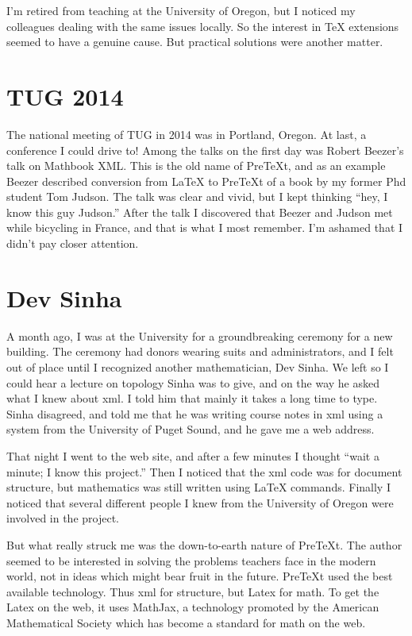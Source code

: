 \documentclass[11pt, oneside]{article}   	%
\begin{document}
I'm retired from teaching at the University of Oregon, but I noticed my colleagues dealing with the same issues locally. So the interest in TeX extensions seemed to have a genuine cause. But practical solutions were another matter.

\section{TUG 2014}

The national meeting of TUG in 2014 was in Portland, Oregon. At last, a conference I could drive to! Among the talks on the first day was Robert Beezer's talk on Mathbook XML. This is the old name of PreTeXt, and as an example Beezer described conversion from LaTeX to PreTeXt of a book by my former Phd student Tom Judson.
The talk was clear and vivid, but I kept thinking ``hey, I know this guy Judson.''
After the talk I discovered that Beezer and Judson met while bicycling in France, and that is what I most remember.  I'm ashamed that I didn't pay closer attention.

\section{Dev Sinha}
A month ago, I was at the University for a groundbreaking ceremony for a new building. The ceremony had donors wearing suits and administrators, and I felt out of place until I recognized another mathematician, Dev Sinha. We left so I could hear a lecture on topology Sinha was to give, and on the way he asked what I knew about xml. I told him that mainly it takes a long time to type. Sinha disagreed, and told me that he was writing course notes in xml using a system from the University of Puget Sound, and he gave me a web address.

That night I went to the web site, and after a few minutes I thought ``wait a minute; I know this project.'' Then I noticed that the xml code was for document structure, but mathematics was still written using LaTeX commands. Finally I noticed that several different people I knew from the University of Oregon were involved in the project.

But what really struck me was the down-to-earth nature of PreTeXt. The author seemed to be interested in solving the problems teachers face in the modern world, not in ideas which might bear fruit in the future. PreTeXt used the best available technology. Thus xml for structure, but Latex for math. To get the Latex on the web, it uses MathJax, a technology promoted by the American Mathematical Society which has become a standard for math on the web.
\end{document}
